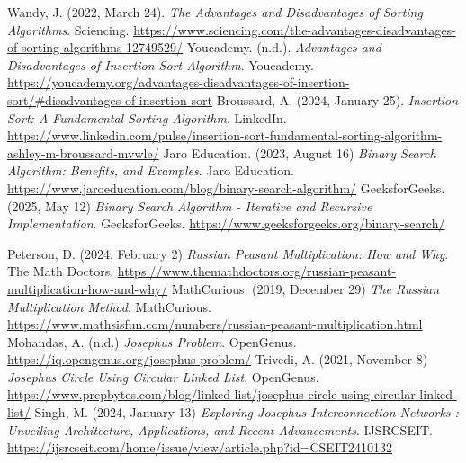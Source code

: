 \documentclass{article}
\begin{document}
\clearpage
\begin{thebibliography}{}

 Wandy, J. (2022, March 24). \textit{The Advantages and Disadvantages of Sorting Algorithms}. Sciencing. \url{https://www.sciencing.com/the-advantages-disadvantages-of-sorting-algorithms-12749529/}
 Youcademy. (n.d.). \textit{Advantages and Disadvantages of Insertion Sort Algorithm}. Youcademy. \url{https://youcademy.org/advantages-disadvantages-of-insertion-sort/#disadvantages-of-insertion-sort}
 Broussard, A. (2024, January 25). \textit{Insertion Sort: A Fundamental Sorting Algorithm}. LinkedIn. \url{https://www.linkedin.com/pulse/insertion-sort-fundamental-sorting-algorithm-ashley-m-broussard-mvwle/}
 Jaro Education. (2023, August 16) \textit{Binary Search Algorithm: Benefits, and Examples}. Jaro Education. \url{https://www.jaroeducation.com/blog/binary-search-algorithm/}
 GeeksforGeeks. (2025, May 12) \textit{Binary Search Algorithm - Iterative and Recursive Implementation}. GeeksforGeeks. \url{https://www.geeksforgeeks.org/binary-search/}

 Peterson, D. (2024, February 2) \textit{Russian Peasant Multiplication: How and Why}. The Math Doctors. \url{https://www.themathdoctors.org/russian-peasant-multiplication-how-and-why/}
 MathCurious. (2019, December 29) \textit{The Russian Multiplication Method}. MathCurious. \url{https://www.mathsisfun.com/numbers/russian-peasant-multiplication.html}
 Mohandas, A. (n.d.) \textit{Josephus Problem}. OpenGenus. \url{https://iq.opengenus.org/josephus-problem/}
 Trivedi, A. (2021, November 8) \textit{Josephus Circle Using Circular Linked List}. OpenGenus. \url{https://www.prepbytes.com/blog/linked-list/josephus-circle-using-circular-linked-list/}
 Singh, M. (2024, January 13) \textit{Exploring Josephus Interconnection Networks : Unveiling Architecture, Applications, and Recent Advancements}. IJSRCSEIT. \url{https://ijsrcseit.com/home/issue/view/article.php?id=CSEIT2410132}
\end{thebibliography}
\end{document}
